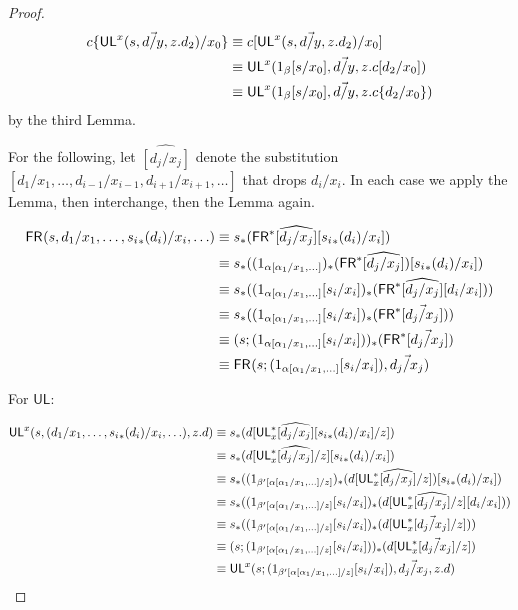 \begin{proof}
\begin{align*}
c\{\mathsf{UL}^{x}_{}(s,\vec{d/y},z.d_2)/x_0\} 
&\equiv c[\mathsf{UL}^{x}_{}(s,\vec{d/y},z.d_2)/x_0] \\
&\equiv \mathsf{UL}^{x}_{}(1_\beta[s/x_0],\vec{d/y},z.c[d_2/x_0]) \\
&\equiv \mathsf{UL}^{x}_{}(1_\beta[s/x_0],\vec{d/y},z.c\{d_2/x_0\}) \\
\end{align*}
by the third Lemma.

For the following, let $\widehat{[d_j/x_j]}$ denote the substitution $[d_1/x_1, \dots, d_{i-1}/x_{i-1}, d_{i+1}/x_{i+1}, \dots]$ that drops $d_i/x_i$. In each case we apply the Lemma, then interchange, then the Lemma again.

\begin{align*}
\mathsf{FR}_{}(s,d_1/x_1,\ldots,{s_i}_*(d_i)/x_i,\ldots) 
&\equiv s_*(\mathsf{FR}^*\widehat{[d_j/x_j]}[{s_i}_*(d_i)/x_i])\\
&\equiv s_*((1_{\alpha[\alpha_1/x_1,\ldots]})_*(\mathsf{FR}^*\widehat{[d_j/x_j]})[{s_i}_*(d_i)/x_i])\\
&\equiv s_*((1_{\alpha[\alpha_1/x_1,\ldots]}[s_i/x_i])_*(\mathsf{FR}^*\widehat{[d_j/x_j]}[d_i/x_i]))\\
&\equiv s_*((1_{\alpha[\alpha_1/x_1,\ldots]}[s_i/x_i])_*(\mathsf{FR}^*[\vec{d_j/x_j}]))\\
&\equiv (s;(1_{\alpha[\alpha_1/x_1,\ldots]}[s_i/x_i]))_*(\mathsf{FR}^*[\vec{d_j/x_j}]) \\
& \equiv \mathsf{FR}_{}(s;(1_{\alpha[\alpha_1/x_1,\ldots]}[s_i/x_i]),\vec{d_j/x_j}) 
\end{align*}

For $\mathsf{UL}$:

\begin{align*}
\mathsf{UL}^{x}_{}(s,(d_1/x_1,\ldots,{s_i}_*(d_i)/x_i,\ldots),z.d) 
&\equiv s_*(d[\mathsf{UL}^*_{x}\widehat{[d_j/x_j]}[{s_i}_*(d_i)/x_i]/z]) \\
&\equiv s_*(d[\mathsf{UL}^*_{x}\widehat{[d_j/x_j]}/z][{s_i}_*(d_i)/x_i]) \\
&\equiv s_*((1_{\beta'[\alpha[\alpha_1/x_1,\ldots]/z]})_*(d[\mathsf{UL}^*_{x}\widehat{[d_j/x_j]}/z])[{s_i}_*(d_i)/x_i]) \\
&\equiv s_*((1_{\beta'[\alpha[\alpha_1/x_1,\ldots]/z]}[s_i/x_i])_*(d[\mathsf{UL}^*_{x}\widehat{[d_j/x_j]}/z][d_i/x_i])) \\
&\equiv s_*((1_{\beta'[\alpha[\alpha_1/x_1,\ldots]/z]}[s_i/x_i])_*(d[\mathsf{UL}^*_{x}[\vec{d_j/x_j}]/z])) \\
&\equiv (s;(1_{\beta'[\alpha[\alpha_1/x_1,\ldots]/z]}[s_i/x_i]))_*(d[\mathsf{UL}^*_{x}[\vec{d_j/x_j}]/z]) \\
&\equiv \mathsf{UL}^{x}_{}(s;(1_{\beta'[\alpha[\alpha_1/x_1,\ldots]/z]}[s_i/x_i]),\vec{d_j/x_j},z.d)
\end{align*}


\end{proof}
